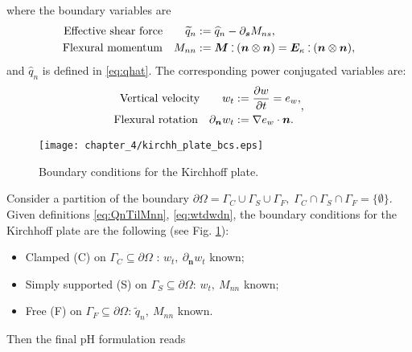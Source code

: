 where the boundary variables are 
\begin{equation}
\label{eq:QnTilMnn}
\begin{aligned}
\text{Effective shear force}  \qquad \widetilde{q}_{n} &:= \widehat{q}_n - \partial_{\bm{s}}{M_{ns}},  \\
\text{Flexural momentum} \quad M_{nn} &:=  \bm{M} \cddot (\bm{n}\otimes{\bm{n}}) = \bm{E}_{\kappa} \cddot (\bm{n}\otimes{\bm{n}}),
\end{aligned}
\end{equation}
and $\widehat{q}_n$ is defined in \eqref{eq:qhat}. The corresponding power conjugated variables are:
\begin{equation}
\label{eq:wtdwdn}
\begin{aligned}
\text{Vertical velocity}  \qquad w_t &:= \diffp{w}{t} = e_w, \\
\text{Flexural rotation} \quad 
\partial_{\bm{n}}{w_t} &:= \nabla{e_w} \cdot \bm{n}.
\end{aligned},
\end{equation}

\begin{figure}[tb]
	\centering
	\texttt{[image: chapter\_4/kirchh\_plate\_bcs.eps]}
	\caption{Boundary conditions for the Kirchhoff plate.}
	\label{fig:bcs_kirchh}
\end{figure}
Consider a partition of the boundary $\partial \Omega  = {\Gamma}_{C} \cup {\Gamma}_{S} \cup {\Gamma}_{F}, \; {\Gamma}_{C} \cap {\Gamma}_{S} \cap {\Gamma}_{F} = \{\emptyset\}$. Given definitions \eqref{eq:QnTilMnn}, \eqref{eq:wtdwdn}, the boundary conditions for the Kirchhoff plate \cite{gustafsson2018} are the following (see Fig. \ref{fig:bcs_kirchh}):
\begin{itemize}
	\item Clamped (C) on $\Gamma_{C}\subseteq \partial \Omega$ : $w_t, \ \partial_{\bm{n}}{w_t}$ known;
	\item Simply supported (S) on $\Gamma_{S}\subseteq \partial \Omega$: $w_t, \ M_{nn}$ known;
	\item Free (F) on $\Gamma_{F}\subseteq \partial \Omega$: $\widetilde{q}_n, \ M_{nn}$ known.
\end{itemize}
Then the final pH formulation reads

